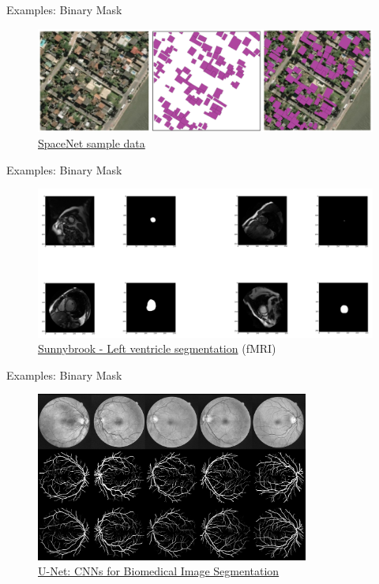 \documentclass[handout]{beamer}
\begin{document}
\begin{frame}{Examples: Binary Mask}
\begin{figure}
\includegraphics[width=\textwidth]{../media/spacenet_1.png}
\caption{\href{https://devblogs.nvidia.com/parallelforall/exploring-spacenet-dataset-using-digits}{\color{blue} SpaceNet sample data}}
\end{figure}
\end{frame}

\begin{frame}{Examples: Binary Mask}
\begin{figure}
\includegraphics[width=\textwidth]{../media/lv_segmentation.png}
\caption{\href{http://www.cardiacatlas.org/studies/sunnybrook-cardiac-data/}{\color{blue} Sunnybrook - Left ventricle segmentation} (fMRI)}
\end{figure}
\end{frame}

\begin{frame}{Examples: Binary Mask}
\begin{figure}
\includegraphics[width=0.8\textwidth]{../media/unet_retina_segmentation.png}
\caption{\href{https://github.com/orobix/retina-unet}{\color{blue} U-Net: CNNs for Biomedical Image Segmentation}}
\end{figure}
\end{frame}
\end{document}
